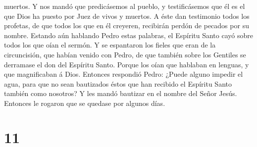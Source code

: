 muertos.  Y nos mandó que predicásemos al pueblo, y
testificásemos que él es el que Dios ha puesto por Juez de vivos y
muertos.  A éste dan testimonio todos los profetas, de que
todos los que en él creyeren, recibirán perdón de pecados por su nombre.
 Estando aún hablando Pedro estas palabras, el Espíritu
Santo cayó sobre todos los que oían el sermón.  Y se
espantaron los fieles que eran de la circuncisión, que habían venido con
Pedro, de que también sobre los Gentiles se derramase el don del
Espíritu Santo.  Porque los oían que hablaban en lenguas, y
que magnificaban á Dios.  Entonces respondió Pedro: ¿Puede
alguno impedir el agua, para que no sean bautizados éstos que han
recibido el Espíritu Santo también como nosotros?  Y les
mandó bautizar en el nombre del Señor Jesús. Entonces le rogaron que se
quedase por algunos días.

\hypertarget{section-10}{%
\section{11}\label{section-10}}

